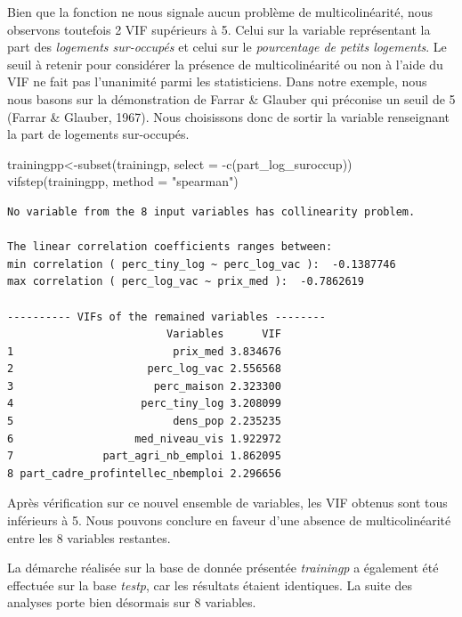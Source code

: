 \documentclass[
  french,
  11pt,
  a4paper,
]{article}
\newenvironment{Shaded}{}{}
\newcommand{\AttributeTok}[1]{\textcolor[rgb]{0.84,0.23,0.29}{#1}}
\newcommand{\FunctionTok}[1]{\textcolor[rgb]{0.44,0.26,0.76}{#1}}
\newcommand{\NormalTok}[1]{\textcolor[rgb]{0.14,0.16,0.18}{#1}}
\newcommand{\OtherTok}[1]{\textcolor[rgb]{0.44,0.26,0.76}{#1}}
\newcommand{\SpecialCharTok}[1]{\textcolor[rgb]{0.00,0.36,0.77}{#1}}
\newcommand{\StringTok}[1]{\textcolor[rgb]{0.01,0.18,0.38}{#1}}
\begin{document}
Bien que la fonction ne nous signale aucun problème de multicolinéarité,
nous observons toutefois 2 VIF supérieurs à 5. Celui sur la variable
représentant la part des \emph{logements sur-occupés} et celui sur le
\emph{pourcentage de petits logements}. Le seuil à retenir pour
considérer la présence de multicolinéarité ou non à l'aide du VIF ne
fait pas l'unanimité parmi les statisticiens. Dans notre exemple, nous
nous basons sur la démonstration de Farrar \& Glauber qui préconise un
seuil de 5 (Farrar \& Glauber, 1967). Nous choisissons donc de sortir la
variable renseignant la part de logements sur-occupés.

\begin{Shaded}
\begin{Highlighting}[]
\NormalTok{trainingpp}\OtherTok{\textless{}{-}}\FunctionTok{subset}\NormalTok{(trainingp, }\AttributeTok{select =} \SpecialCharTok{{-}}\FunctionTok{c}\NormalTok{(part\_log\_suroccup))}
\FunctionTok{vifstep}\NormalTok{(trainingpp, }\AttributeTok{method =} \StringTok{"spearman"}\NormalTok{)}
\end{Highlighting}
\end{Shaded}

\begin{verbatim}
No variable from the 8 input variables has collinearity problem. 

The linear correlation coefficients ranges between: 
min correlation ( perc_tiny_log ~ perc_log_vac ):  -0.1387746 
max correlation ( perc_log_vac ~ prix_med ):  -0.7862619 

---------- VIFs of the remained variables -------- 
                         Variables      VIF
1                         prix_med 3.834676
2                     perc_log_vac 2.556568
3                      perc_maison 2.323300
4                    perc_tiny_log 3.208099
5                         dens_pop 2.235235
6                   med_niveau_vis 1.922972
7              part_agri_nb_emploi 1.862095
8 part_cadre_profintellec_nbemploi 2.296656
\end{verbatim}

Après vérification sur ce nouvel ensemble de variables, les VIF obtenus
sont tous inférieurs à 5. Nous pouvons conclure en faveur d'une absence
de multicolinéarité entre les 8 variables restantes.

La démarche réalisée sur la base de donnée présentée \emph{trainingp} a
également été effectuée sur la base \emph{testp}, car les résultats
étaient identiques. La suite des analyses porte bien désormais sur 8
variables.
\end{document}

